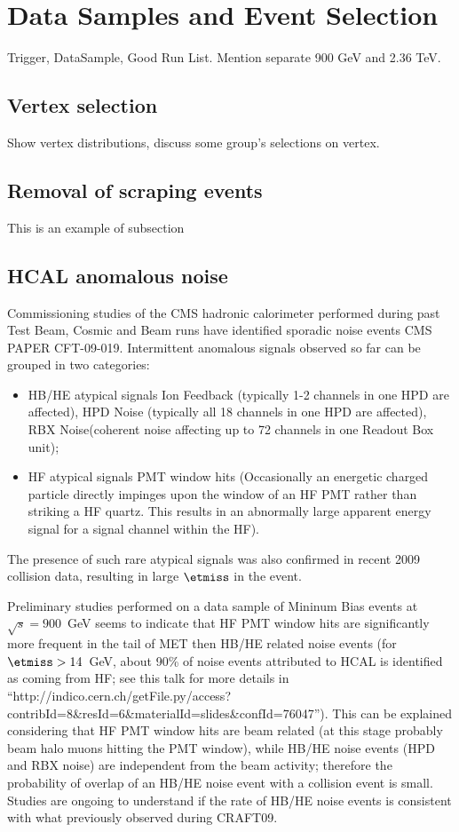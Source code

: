 \section{Data Samples and Event Selection}
Trigger, DataSample, Good Run List. Mention separate 900 GeV and 2.36
TeV. 

\subsection{Vertex selection}
Show vertex distributions, discuss some group's selections on vertex.

\subsection{Removal of scraping events}
This is an example of subsection

\subsection{HCAL anomalous noise}
Commissioning studies of the CMS hadronic calorimeter performed 
during past Test Beam, Cosmic and Beam runs have identified 
sporadic noise events CMS PAPER CFT-09-019.
Intermittent anomalous signals observed so far can be grouped in two categories:
\begin{itemize}
\item{HB/HE atypical signals} Ion Feedback (typically 1-2 channels in one HPD are affected), 
HPD Noise (typically all 18 channels in one HPD are affected), RBX Noise(coherent noise affecting up to 
72 channels in one Readout Box unit);
\item{HF atypical signals} PMT window hits (Occasionally an energetic charged particle directly impinges 
upon the window of an HF PMT rather than striking a HF quartz. This results in an abnormally large 
apparent energy signal for a signal channel within the HF). 
\end{itemize}

The presence of such rare atypical signals was also confirmed in recent 2009 collision data, 
resulting in large $\etmiss$ in the event. 

Preliminary studies performed on a data sample of Mininum Bias events at $\sqrt{s}=900$~GeV 
seems to indicate that HF PMT window hits are significantly more frequent in the tail of MET
then HB/HE related noise events (for $\etmiss>14$~GeV, about 90\% of noise events attributed 
to HCAL is identified as coming from HF; see this talk for more details in 
``http://indico.cern.ch/getFile.py/access?contribId=8\&resId=6\&materialId=slides\&confId=76047'').
This can be explained considering that HF PMT window hits are beam related 
(at this stage probably beam halo muons hitting the PMT window), 
while HB/HE noise events (HPD and RBX noise) are independent from the beam activity; 
therefore the probability of overlap of an HB/HE noise event with a collision event is small.
Studies are ongoing to understand if the rate of HB/HE noise events is consistent with what 
previously observed during CRAFT09.

